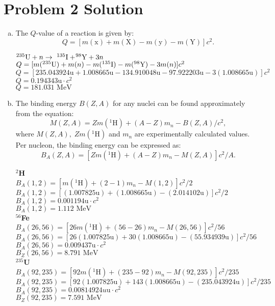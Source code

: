 \documentclass{report}
\newcommand{\tab}{\-\hspace{1.5cm}}
\begin{document}
\section*{Problem 2 Solution}
\begin{enumerate}[a)]
\item The $Q$-value of a reaction is given by:$$Q=[m(\text{x})+m(\text{X})-m(\text{y})-m(\text{Y})]c^{2}.$$

\begin{spacing}{1.75}	
$^{235}\text{\normalfont{U}}+n \rightarrow  \-\ ^{135}\text{\normalfont{I}}+ \! ^{98}\text{\normalfont{Y}}+3n$\\
	\tab $Q = [m(^{235}\text{\normalfont{U}})+m(n)-m(^{135}\text{\normalfont{I}})-m(^{98}\text{\normalfont{Y}})-3m(n)]c^{2}$\\
	\tab $Q = [235.043924\text{u}+1.008665\text{u}-134.910048\text{u}-97.922203\text{u}-3(1.008665\text{u})]c^{2}$\\
	\tab $Q = 0.194343\text{u} \cdot c^{2}$\\
	\tab $\boxed{Q = 181.031 \text{ MeV}}$ 
\end{spacing}


\item The binding energy $B(Z,A)$ for any nuclei can be found approximately from the equation:$$M(Z,A) = Zm(^{1}\text{H})+(A-Z)m_{n}-B(Z,A)/c^{2},$$ where $M(Z,A),\; Zm(^{1}\text{H})$ and $m_{n}$ are experimentally calculated values. Per nucleon, the binding energy can be expressed as: $$B_{A}(Z,A) = [Zm(^{1}\text{H})+(A-Z)m_{n}-M(Z,A)]c^{2}/A.$$

\begin{spacing}{1.75}

\textbf{$^{2}$H}\\
$B_{A}(1,2) = [m(^{1}\text{H})+(2-1)m_{n}-M(1,2)]c^{2}/2$\\
$B_{A}(1,2) = [(1.007825\text{u})+(1.008665\text{u})-(2.014102\text{u})]c^{2}/2$\\
$B_{A}(1,2) = 0.001194\text{u} \cdot c^{2}$\\
$\boxed{B_{A}(1,2) = 1.112\text{ MeV}}$\\
\textbf{$^{56}$Fe}\\
$B_{A}(26,56) = [26m(^{1}\text{H})+(56-26)m_{n}-M(26,56)]c^{2}/56$\\
$B_{A}(26,56) = [26(1.007825\text{u})+30(1.008665\text{u})-(55.934939\text{u})]c^{2}/56$\\
$B_{A}(26,56) = 0.009437\text{u} \cdot c^{2}$\\
$\boxed{B_{Z}(26,56) = 8.791\text{ MeV}}$\\
\textbf{$^{235}$U}\\
$B_{A}(92,235) = [92m(^{1}\text{H})+(235-92)m_{n}-M(92,235)]c^{2}/235$\\
$B_{A}(92,235) = [92(1.007825\text{u})+143(1.008665\text{u})-(235.043924\text{u})]c^{2}/235$\\
$B_{A}(92,235) = 0.00814924 u\text{u} \cdot c^{2}$\\
$\boxed{B_{Z}(92,235) = 7.591\text{ MeV}}$
\end{spacing}
\end{enumerate}
\end{document}
